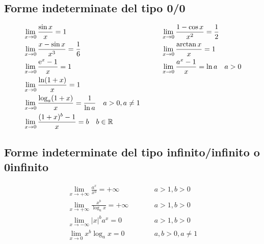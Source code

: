 \subsection{Forme indeterminate del tipo 0/0}
\begin{align*}
&\lim_{x\to0}{\frac{\sin x}{x}}= 1                & \qquad & \lim_{x\to0}{\frac{1-\cos x}{x^2}}=\frac{1}{2} \\
&\lim_{x\to0}{\frac{x-\sin x}{x^3}}=\frac{1}{6}   & \qquad & \lim_{x\to0}{\frac{\arctan x}{x}}= 1 \\
&\lim_{x\to0}{\frac{\mathrm{e}^x-1}{x}}= 1                & \qquad & \lim_{x\to0}{\frac{a^x-1}{x}}= \ln a \quad a>0 \\
&\lim_{x\to0}{\frac{\ln(1+x)}{x}}= 1              & \qquad & \\
&\lim_{x\to0}{\frac{\log_a(1+x)}{x}}= \frac{1}{\ln a} \quad a>0,a\neq1 & \qquad & \\
&\lim_{x\to0}{\frac{(1+x)^b-1}{x}}=b \quad b\in\mathbb{R} & \qquad & 
\end{align*}

\subsection{Forme indeterminate del tipo infinito/infinito o 0infinito}
\begin{align*}
&\lim_{x\to+\infty}{\frac{a^x}{x^b}}=+\infty & \qquad & a>1,b>0 & \\
&\lim_{x\to+\infty}{\frac{x^b}{\log_a x}}=+\infty & \qquad & a>1,b>0 & \\
&\lim_{x\to-\infty}{|x|^b a^x}=0 & \qquad & a>1,b>0 & \\
&\lim_{x\to0}{x^b \log_a x}=0 & \qquad & a,b>0,a\neq 1 &
\end{align*}